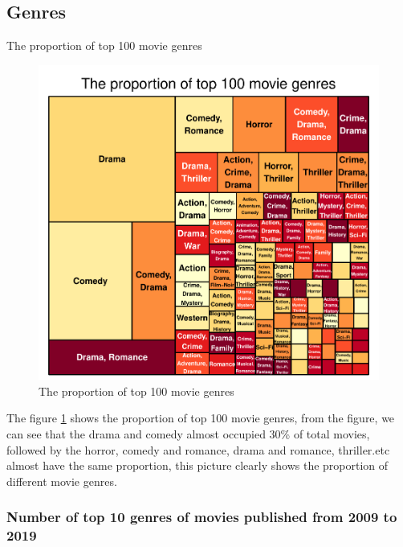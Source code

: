 \documentclass[11pt,a4paper,]{article}
\begin{document}
\hypertarget{genres}{%
\subsection{Genres}\label{genres}}

The proportion of top 100 movie genres

\begin{figure}
\centering
\includegraphics{Report_files/figure-latex/genres-1.pdf}
\caption{\label{fig:genres}The proportion of top 100 movie genres}
\end{figure}

The figure \ref{fig:genres} shows the proportion of top 100 movie genres, from the figure, we can see that the drama and comedy almost occupied 30\% of total movies, followed by the horror, comedy and romance, drama and romance, thriller.etc almost have the same proportion, this picture clearly shows the proportion of different movie genres.

\hypertarget{number-of-top-10-genres-of-movies-published-from-2009-to-2019}{%
\subsubsection{Number of top 10 genres of movies published from 2009 to 2019}\label{number-of-top-10-genres-of-movies-published-from-2009-to-2019}}
\end{document}

